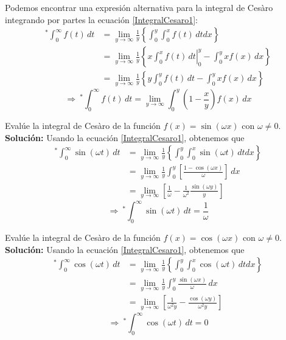 Podemos encontrar una expresión alternativa para la integral de Cesàro integrando por partes la ecuación \eqref{IntegralCesaro1}:
\begin{align*}
    ^* \int_0^{\infty} f(t) \,dt &= \lim_{y \to \infty } \frac{1}{y} \left\{ \int_0^y \int_0^x f(t) \,dt dx \right\} \\
    &= \lim_{y \to \infty } \frac{1}{y} \left\{\left. x \int_0^x f(t)\,dt \right|_0^y - \int_0^y x f(x) \,dx \right\} \\
    &= \lim_{y \to \infty } \frac{1}{y} \left\{ y \int_0^y f(t) \,dt - \int_0^y xf(x) \,dx \right\}
\end{align*}
\begin{equation}
    \Rightarrow ~  \boxed{^* \int_0^{\infty} f(t) \,dt = \lim_{y \to \infty} \int_0^y \left( 1 - \frac{x}{y} \right) f(x) \,dx} \label{IntegralCesaro2}
 \end{equation}
 
 \begin{ejemplo}
Evalúe la integral de Cesàro de la función $f(x) = \sin(\omega x)$ con $\omega \neq 0$.
\\

\textbf{Solución:} Usando la ecuación \eqref{IntegralCesaro1}, obtenemos que
\begin{align*}
      ^* \int_0^{\infty} \sin(\omega t) \,dt &= \lim_{y \to \infty } \frac{1}{y} \left\{ \int_0^y \int_0^x \sin(\omega t) \,dt dx \right\} \\
      &= \lim_{y \to \infty } \frac{1}{y} \int_0^y \left[ \frac{1 - \cos(\omega x)}{\omega}\right] \, dx \\
      &= \lim_{y \to \infty} \left[ \frac{1}{\omega} - \frac{1}{\omega^2} \frac{\sin(\omega y)}{y}\right]
\end{align*}
\begin{equation}
    \Rightarrow ~  \boxed{^* \int_0^{\infty} \sin(\omega t) \,dt = \frac{1}{\omega}} \label{CesaroSeno}
 \end{equation}

 \end{ejemplo}
 
  \begin{ejemplo}
Evalúe la integral de Cesàro de la función $f(x) = \cos(\omega x)$ con $\omega \neq 0$.
\\

\textbf{Solución:} Usando la ecuación \eqref{IntegralCesaro1}, obtenemos que
\begin{align*}
      ^* \int_0^{\infty} \cos(\omega t) \,dt &= \lim_{y \to \infty } \frac{1}{y} \left\{ \int_0^y \int_0^x \cos(\omega t) \,dt dx \right\} \\
      &= \lim_{y \to \infty } \frac{1}{y} \int_0^y \frac{\sin(\omega x)}{\omega} \, dx \\
      &= \lim_{y \to \infty} \left[ \frac{1}{\omega^2 y} - \frac{\cos(\omega y)}{\omega^2 y} \right]
\end{align*}
\begin{equation}
    \Rightarrow ~  \boxed{^* \int_0^{\infty} \cos(\omega t) \,dt = 0 } \label{CesaroCoseno}
 \end{equation}

 \end{ejemplo}